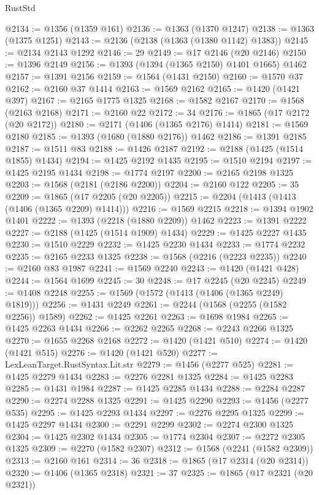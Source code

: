 \begin{lexlean}{RustStd}
\begin{coremodule}
@2134 := @1356 (@1359 @161)
@2136 := @1363 (@1370 @1247)
@2138 := @1363 (@1375 @1251)
@2143 := @2136 (@2138 (@1363 (@1380 @1142) @1383))
@2145 := @2134 @2143 @1292
@2146 := 29
@2149 := @17 @2146 (@20 @2146)
@2150 := @1396 @2149
@2156 := @1393 (@1394 (@1365 @2150) @1401 @1665) @1462
@2157 := @1391 @2156
@2159 := @1564 (@1431 @2150)
@2160 := @1570 @37
@2162 := @2160 @37 @1414
@2163 := @1569 @2162
@2165 := @1420 (@1421 @397)
@2167 := @2165 @1775 @1325
@2168 := @1582 @2167
@2170 := @1568 (@2163 @2168)
@2171 := @2160 @22
@2172 := 34
@2176 := @1865 (@17 @2172 (@20 @2172))
@2180 := @2171 (@1406 (@1365 @2176) @1414)
@2181 := @1569 @2180
@2185 := @1393 (@1680 (@1880 @2176)) @1462
@2186 := @1391 @2185
@2187 := @1511 @83
@2188 := @1426 @2187
@2192 := @2188 (@1425 (@1514 @1855) @1434)
@2194 := @1425 @2192 @1435
@2195 := @1510 @2194
@2197 := @1425 @2195 @1434
@2198 := @1774 @2197
@2200 := @2165 @2198 @1325
@2203 := @1568 (@2181 (@2186 @2200))
@2204 := @2160 @122
@2205 := 35
@2209 := @1865 (@17 @2205 (@20 @2205))
@2215 := @2204 (@1413 (@1413 (@1406 (@1365 @2209) @1414)))
@2216 := @1569 @2215
@2218 := @1394 @1902 @1401
@2222 := @1393 (@2218 (@1880 @2209)) @1462
@2223 := @1391 @2222
@2227 := @2188 (@1425 (@1514 @1909) @1434)
@2229 := @1425 @2227 @1435
@2230 := @1510 @2229
@2232 := @1425 @2230 @1434
@2233 := @1774 @2232
@2235 := @2165 @2233 @1325
@2238 := @1568 (@2216 (@2223 @2235))
@2240 := @2160 @83 @1987
@2241 := @1569 @2240
@2243 := @1420 (@1421 @428)
@2244 := @1564 @1699
@2245 := 30
@2248 := @17 @2245 (@20 @2245)
@2249 := @1408 @2248
@2255 := @1569 (@1572 (@1413 (@1406 (@1365 @2249) @1819)))
@2256 := @1431 @2249
@2261 := @2244 (@1568 (@2255 (@1582 @2256)) @1589)
@2262 := @1425 @2261
@2263 := @1698 @1984
@2265 := @1425 @2263 @1434
@2266 := @2262 @2265
@2268 := @2243 @2266 @1325
@2270 := @1655 @2268 @2168
@2272 := @1420 (@1421 @510)
@2274 := @1420 (@1421 @515)
@2276 := @1420 (@1421 @520)
@2277 := LexLeanTarget.RustSyntax.Lit.str
@2279 := @1456 (@2277 @525)
@2281 := @1425 @2279 @1434
@2283 := @2276 @2281 @1325
@2284 := @1425 @2283
@2285 := @1431 @1984
@2287 := @1425 @2285 @1434
@2288 := @2284 @2287
@2290 := @2274 @2288 @1325
@2291 := @1425 @2290
@2293 := @1456 (@2277 @535)
@2295 := @1425 @2293 @1434
@2297 := @2276 @2295 @1325
@2299 := @1425 @2297 @1434
@2300 := @2291 @2299
@2302 := @2274 @2300 @1325
@2304 := @1425 @2302 @1434
@2305 := @1774 @2304
@2307 := @2272 @2305 @1325
@2309 := @2270 (@1582 @2307)
@2312 := @1568 (@2241 (@1582 @2309))
@2313 := @2160 @161
@2314 := 36
@2318 := @1865 (@17 @2314 (@20 @2314))
@2320 := @1406 (@1365 @2318)
@2321 := 37
@2325 := @1865 (@17 @2321 (@20 @2321))

\end{coremodule}
\end{lexlean}
